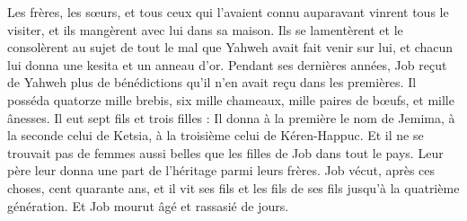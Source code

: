 \begin{multicols}{2}
Les frères, les sœurs, et tous ceux qui l'avaient connu auparavant vinrent tous le visiter, et ils mangèrent avec lui dans sa maison. Ils se lamentèrent et le consolèrent au sujet de tout le mal que Yahweh avait fait venir sur lui, et chacun lui donna une kesita et un anneau d'or.
Pendant ses dernières années, Job reçut de Yahweh plus de bénédictions qu'il n'en avait reçu dans les premières. Il posséda quatorze mille brebis, six mille chameaux, mille paires de bœufs, et mille ânesses.
Il eut sept fils et trois filles :
Il donna à la première le nom de Jemima, à la seconde celui de Ketsia, à la troisième celui de Kéren-Happuc.
Et il ne se trouvait pas de femmes aussi belles que les filles de Job dans tout le pays. Leur père leur donna une part de l'héritage parmi leurs frères.
Job vécut, après ces choses, cent quarante ans, et il vit ses fils et les fils de ses fils jusqu'à la quatrième génération.
Et Job mourut âgé et rassasié de jours.
\PPE{}
\end{multicols}
